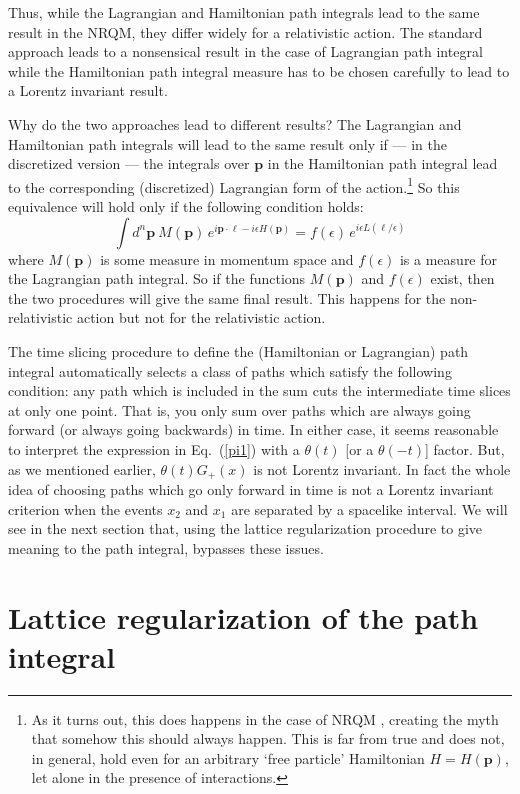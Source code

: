 \documentclass{article}
\def\eq#1{{Eq.~(\ref{#1})}}
\begin{document}
Thus, while the Lagrangian and Hamiltonian path integrals lead to the same result in the NRQM, they differ widely for a relativistic action. The standard approach leads to a nonsensical result in the case of Lagrangian path integral while the Hamiltonian path integral measure has to be chosen carefully to lead to a Lorentz invariant result. 

Why do the two approaches lead to different results?
The Lagrangian and Hamiltonian path integrals  will lead to the same result  only if --- in the discretized version --- the integrals over $\bm{p}$ in the Hamiltonian path integral lead to the corresponding (discretized) Lagrangian form of the action.\footnote{As it turns out, this does happens in the case of NRQM , creating the myth that somehow this should always happen. This is far from true and does not, in general, hold even for an arbitrary `free particle' Hamiltonian $H=H(\bm{p})$, let alone in the presence of interactions.} So this  equivalence will hold only if the following condition holds: 
\begin{equation}
 \int d^n \bm{p} \ M(\bm{p}) \, e^{i\bm{p\cdot \ell} - i \epsilon H(\bm{p})} = f(\epsilon) \, e^{i\epsilon L(\bm{\ell}/\epsilon)}
\label{hlequiv} 
\end{equation}  
where $M(\bm{p})$ is some measure in momentum space and $f(\epsilon)$ is a measure for the Lagrangian path integral. So if the functions $M(\bm{p})$ and 
$f(\epsilon)$ exist, then the two procedures will give the same final result. 
This happens  for the non-relativistic action but not for the relativistic action. 

The time slicing procedure to define the (Hamiltonian or Lagrangian) path integral automatically selects a class of paths which satisfy the following condition: any path which is included in the sum cuts the intermediate time slices at only one point. That is, you only sum over paths which are always going forward (or always going backwards) in time. In either case, it seems reasonable to  interpret the expression in \eq{pi1} with a $\theta(t)$ [or a $\theta(-t)$] factor. But, as we mentioned earlier, $\theta(t)G_+(x)$ is not Lorentz invariant. In fact the whole idea of choosing paths which go only forward in time is not a Lorentz invariant criterion when the events $x_2$ and $x_1$ are separated by a spacelike interval. We will see in the next section that, using the lattice regularization procedure to give meaning to the path integral, bypasses these issues.


\section{Lattice regularization of the path integral}\label{sec:lattice}
\end{document}
